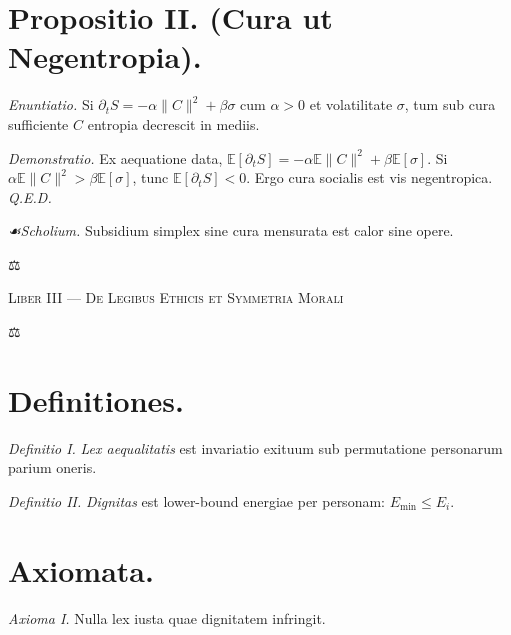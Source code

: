 \documentclass[12pt]{article}
\newcommand{\justitia}{\centerline{\Large ⚖}}
\newcommand{\scholia}{\textit{☙\;}}
\newcommand{\divider}{\vspace{1em}\justitia\vspace{1em}}
\newcommand{\Liber}[1]{\vspace{1ex}\begin{center}\Large\textsc{Liber #1}\end{center}\vspace{-0.5ex}\justitia\vspace{0.5ex}}
\begin{document}
\begin{center}
\end{center}

\section*{Propositio II. \; (Cura ut Negentropia).}

\textit{Enuntiatio.} \; Si \(\partial_t S = -\alpha \|C\|^2 + \beta \sigma\) cum \(\alpha>0\) et volatilitate \(\sigma\), tum sub cura sufficiente \(C\) entropia decrescit in mediis.

\textit{Demonstratio.} Ex aequatione data, \(\mathbb{E}[\partial_t S] = -\alpha \mathbb{E}\|C\|^2 + \beta \mathbb{E}[\sigma]\). Si \(\alpha \mathbb{E}\|C\|^2 > \beta \mathbb{E}[\sigma]\), tunc \(\mathbb{E}[\partial_t S]<0\). Ergo cura socialis est vis negentropica. \textit{Q.E.D.}

\textit{\scholia Scholium.} Subsidium simplex sine cura mensurata est calor sine opere.

\divider

\Liber{III — De Legibus Ethicis et Symmetria Morali}

\section*{Definitiones.}

\textit{Definitio I.} \; \textit{Lex aequalitatis} est invariatio exituum sub permutatione personarum parium oneris.

\textit{Definitio II.} \; \textit{Dignitas} est lower-bound energiae per personam: \(E_{\min} \le E_i\).

\section*{Axiomata.}

\textit{Axioma I.} \; Nulla lex iusta quae dignitatem infringit.
\end{document}
